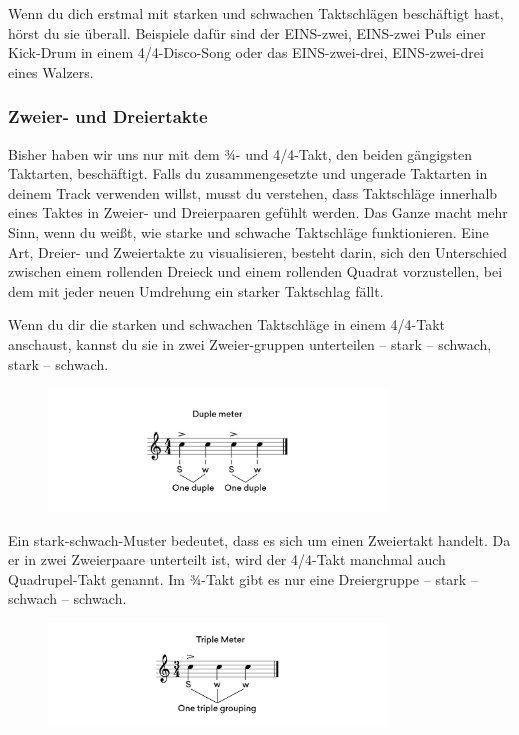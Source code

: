 Wenn du dich erstmal mit starken und schwachen Taktschlägen beschäftigt hast, hörst du sie überall. Beispiele dafür sind der EINS-zwei, EINS-zwei Puls einer Kick-Drum in einem 4/4-Disco-Song oder das EINS-zwei-drei, EINS-zwei-drei eines Walzers.

\subsubsection{Zweier- und Dreiertakte}
Bisher haben wir uns nur mit dem ¾- und 4/4-Takt, den beiden gängigsten Taktarten, beschäftigt. Falls du zusammengesetzte und ungerade Taktarten in deinem Track verwenden willst, musst du verstehen, dass Taktschläge innerhalb eines Taktes in Zweier- und Dreierpaaren gefühlt werden. Das Ganze macht mehr Sinn, wenn du weißt, wie starke und schwache Taktschläge funktionieren. Eine Art, Dreier- und Zweiertakte zu visualisieren, besteht darin, sich den Unterschied zwischen einem rollenden Dreieck und einem rollenden Quadrat vorzustellen, bei dem mit jeder neuen Umdrehung ein starker Taktschlag fällt.

Wenn du dir die starken und schwachen Taktschläge in einem 4/4-Takt anschaust, kannst du sie in zwei Zweier-gruppen unterteilen – stark – schwach, stark – schwach.

\begin{figure}[H]
    \centering
    \includegraphics[width=0.8\textwidth]{images/Rythm_body_4}
\end{figure}

Ein stark-schwach-Muster bedeutet, dass es sich um einen Zweiertakt handelt. Da er in zwei Zweierpaare unterteilt ist, wird der 4/4-Takt manchmal auch Quadrupel-Takt genannt. Im ¾-Takt gibt es nur eine Dreiergruppe – stark – schwach – schwach.

\begin{figure}[H]
    \centering
    \includegraphics[width=0.8\textwidth]{images/Rythm_body_5}
\end{figure}

